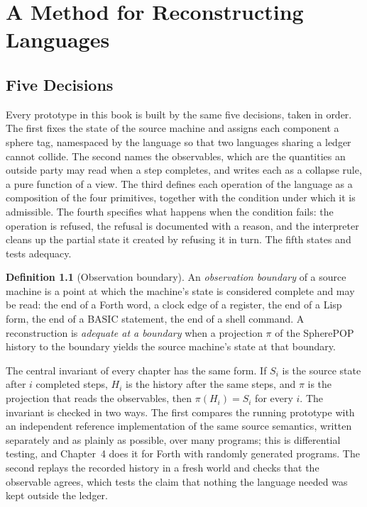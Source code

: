 \documentclass[11pt,oneside]{report}
\newcommand{\SP}{SpherePOP}
\theoremstyle{plain}
\theoremstyle{definition}
\newtheorem{definition}[proposition]{Definition}
\theoremstyle{remark}
\begin{document}
\chapter{A Method for Reconstructing Languages}

\section{Five Decisions}

Every prototype in this book is built by the same five decisions, taken in order. The first fixes the state of the source machine and assigns each component a sphere tag, namespaced by the language so that two languages sharing a ledger cannot collide. The second names the observables, which are the quantities an outside party may read when a step completes, and writes each as a collapse rule, a pure function of a view. The third defines each operation of the language as a composition of the four primitives, together with the condition under which it is admissible. The fourth specifies what happens when the condition fails: the operation is refused, the refusal is documented with a reason, and the interpreter cleans up the partial state it created by refusing it in turn. The fifth states and tests adequacy.

\begin{definition}[Observation boundary]
An \emph{observation boundary} of a source machine is a point at which the machine's state is considered complete and may be read: the end of a Forth word, a clock edge of a register, the end of a Lisp form, the end of a BASIC statement, the end of a shell command. A reconstruction is \emph{adequate at a boundary} when a projection $\pi$ of the \SP{} history to the boundary yields the source machine's state at that boundary.
\end{definition}

The central invariant of every chapter has the same form. If $S_i$ is the source state after $i$ completed steps, $H_i$ is the history after the same steps, and $\pi$ is the projection that reads the observables, then $\pi(H_i)=S_i$ for every $i$. The invariant is checked in two ways. The first compares the running prototype with an independent reference implementation of the same source semantics, written separately and as plainly as possible, over many programs; this is differential testing, and Chapter~4 does it for Forth with randomly generated programs. The second replays the recorded history in a fresh world and checks that the observable agrees, which tests the claim that nothing the language needed was kept outside the ledger.
\end{document}
